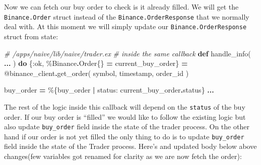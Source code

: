 \documentclass[
]{book}
\newenvironment{Shaded}{\begin{snugshade}}{\end{snugshade}}
\newcommand{\CommentTok}[1]{\textcolor[rgb]{0.56,0.35,0.01}{\textit{#1}}}
\newcommand{\ConstantTok}[1]{\textcolor[rgb]{0.00,0.00,0.00}{#1}}
\newcommand{\KeywordTok}[1]{\textcolor[rgb]{0.13,0.29,0.53}{\textbf{#1}}}
\newcommand{\NormalTok}[1]{#1}
\newcommand{\OperatorTok}[1]{\textcolor[rgb]{0.81,0.36,0.00}{\textbf{#1}}}
\newcommand{\OtherTok}[1]{\textcolor[rgb]{0.56,0.35,0.01}{#1}}
\newcommand{\VariableTok}[1]{\textcolor[rgb]{0.00,0.00,0.00}{#1}}
\begin{document}
Now we can fetch our buy order to check is it already filled. We will get the \texttt{Binance.Order} struct instead of the \texttt{Binance.OrderResponse} that we normally deal with. At this moment we will simply update our \texttt{Binance.OrderResponse} struct from state:

\begin{Shaded}
\begin{Highlighting}[]
  \CommentTok{\# /apps/naive/lib/naive/trader.ex}
  \CommentTok{\# inside the same callback}
  \KeywordTok{def}\NormalTok{ handle\_info(}
      \OperatorTok{...}
\NormalTok{      ) }\KeywordTok{do}
\NormalTok{    \{}\VariableTok{:ok}\NormalTok{, \%}\ConstantTok{Binance}\OperatorTok{.}\ConstantTok{Order}\NormalTok{\{\} }\OperatorTok{=}\NormalTok{ current\_buy\_order\} }\OperatorTok{=}
      \OtherTok{@binance\_client}\OperatorTok{.}\NormalTok{get\_order(}
\NormalTok{        symbol,}
\NormalTok{        timestamp,}
\NormalTok{        order\_id}
\NormalTok{      )}
    
\NormalTok{    buy\_order }\OperatorTok{=}\NormalTok{ \%\{buy\_order }\OperatorTok{|} \VariableTok{status:}\NormalTok{ current\_buy\_order}\OperatorTok{.}\NormalTok{status\}}
    \OperatorTok{...}
\end{Highlighting}
\end{Shaded}

The rest of the logic inside this callback will depend on the \texttt{status} of the buy order. If our buy order is ``filled'' we would like to follow the existing logic but also update \texttt{buy\_order} field inside the state of the trader process. On the other hand if our order is not yet filled the only thing to do is to update \texttt{buy\_order} field inside the state of the Trader process. Here's and updated body below above changes(few variables got renamed for clarity as we are now fetch the order):
\end{document}
